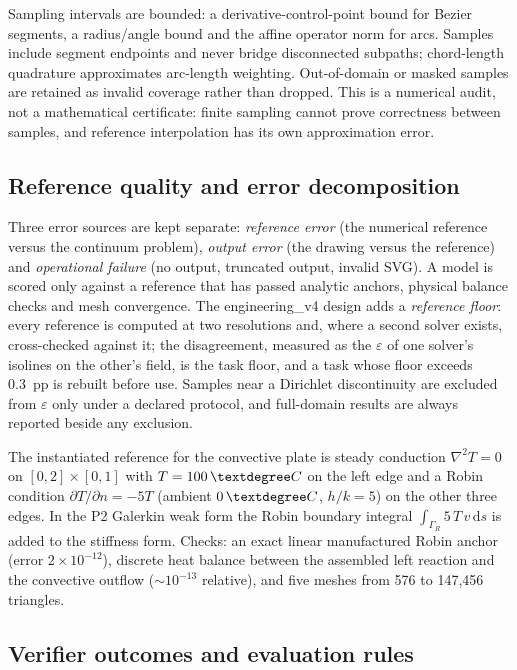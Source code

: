 \documentclass[11pt,a4paper]{article}
\newcommand{\degC}{\,\textdegree C}
\begin{document}
Sampling intervals are bounded: a derivative-control-point bound for Bezier segments, a radius/angle bound and the affine operator norm for arcs. Samples include segment endpoints and never bridge disconnected subpaths; chord-length quadrature approximates arc-length weighting. Out-of-domain or masked samples are retained as invalid coverage rather than dropped. This is a numerical audit, not a mathematical certificate: finite sampling cannot prove correctness between samples, and reference interpolation has its own approximation error.

\subsection{Reference quality and error decomposition}

Three error sources are kept separate: \emph{reference error} (the numerical reference versus the continuum problem), \emph{output error} (the drawing versus the reference) and \emph{operational failure} (no output, truncated output, invalid SVG). A model is scored only against a reference that has passed analytic anchors, physical balance checks and mesh convergence. The engineering\_v4 design adds a \emph{reference floor}: every reference is computed at two resolutions and, where a second solver exists, cross-checked against it; the disagreement, measured as the $\varepsilon$ of one solver's isolines on the other's field, is the task floor, and a task whose floor exceeds 0.3~pp is rebuilt before use. Samples near a Dirichlet discontinuity are excluded from $\varepsilon$ only under a declared protocol, and full-domain results are always reported beside any exclusion.

The instantiated reference for the convective plate is steady conduction $\nabla^2 T = 0$ on $[0,2]\times[0,1]$ with $T=100\degC$ on the left edge and a Robin condition $\partial T/\partial n = -5T$ (ambient $0\degC$, $h/k = 5$) on the other three edges. In the P2 Galerkin weak form the Robin boundary integral $\int_{\Gamma_R} 5\,T\,v\,\mathrm{d}s$ is added to the stiffness form. Checks: an exact linear manufactured Robin anchor (error $2\times10^{-12}$), discrete heat balance between the assembled left reaction and the convective outflow ($\sim 10^{-13}$ relative), and five meshes from 576 to 147{,}456 triangles.

\subsection{Verifier outcomes and evaluation rules}
\end{document}
